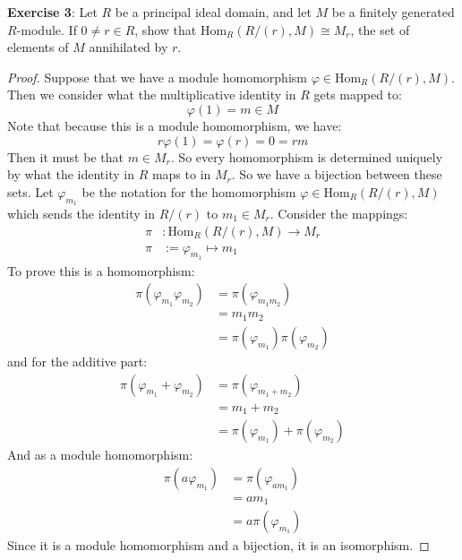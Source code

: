 \documentclass{article}
\begin{document}
\textbf{Exercise 3}: Let $R$ be a principal ideal domain, and let $M$ be a finitely generated $R$-module. If $0 \neq r \in R$, show that $\text{Hom}_{R}(R/(r), M) \cong M_{r}$, the set of elements of $M$ annihilated by $r$.
    \begin{proof}
        Suppose that we have a module homomorphism $\varphi \in \text{Hom}_{R}(R/(r), M)$. Then we consider what the multiplicative identity in $R$ gets mapped to:
            \begin{equation*}
                \varphi(1) = m \in M
            \end{equation*}
        Note that because this is a module homomorphism, we have:
            \begin{equation*}
                r\varphi(1) = \varphi(r) = 0 = rm
            \end{equation*}
        Then it must be that $m \in M_{r}$. So every homomorphism is determined uniquely by what the identity in $R$ maps to in $M_{r}$. So we have a bijection between these sets. Let $\varphi_{m_{1}}$ be the notation for the homomorphism $\varphi \in \text{Hom}_{R}(R/(r), M)$ which sends the identity in $R/(r)$ to $m_{1} \in M_{r}$. Consider the mappings:
            \begin{align*}
                \pi &: \text{Hom}_{R}(R/(r), M) \rightarrow M_{r} \\
                \pi &:= \varphi_{m_{1}} \mapsto m_{1}
            \end{align*}
        To prove this is a homomorphism:
            \begin{align*}
                \pi(\varphi_{m_{1}}\varphi_{m_{2}}) &= \pi(\varphi_{m_{1}m_{2}})                \\
                                                    &= m_{1}m_{2}                               \\
                                                    &= \pi(\varphi_{m_{1}})\pi(\varphi_{m_{2}})   
            \end{align*}
        and for the additive part:
            \begin{align*}
                \pi(\varphi_{m_{1}} + \varphi_{m_{2}}) &= \pi(\varphi_{m_{1} + m_{2}})                \\
                                                       &= m_{1} + m_{2}                               \\
                                                       &= \pi(\varphi_{m_{1}}) + \pi(\varphi_{m_{2}})   
            \end{align*}
        And as a module homomorphism:
            \begin{align*}
                \pi(a\varphi_{m_{1}}) &= \pi(\varphi_{am_{1}}) \\
                                      &= am_{1}                \\
                                      &= a\pi(\varphi_{m_{1}})   
            \end{align*}
        Since it is a module homomorphism and a bijection, it is an isomorphism.
    \end{proof}
\end{document}

